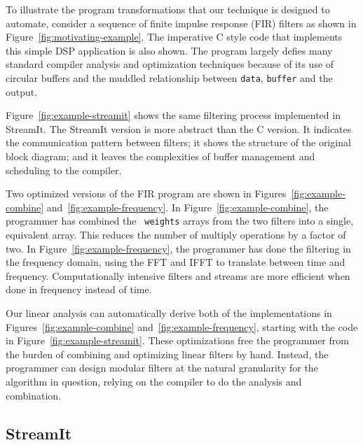 To illustrate the program transformations that our technique is
designed to automate, consider a sequence of finite impulse response
(FIR) filters as shown in Figure~\ref{fig:motivating-example}. The
imperative C style code that implements this simple DSP application is
also shown. The program largely defies many standard compiler analysis
and optimization techniques because of its use of circular buffers and
the muddled relationship between {\tt data}, {\tt buffer} and the
output.

Figure~\ref{fig:example-streamit} shows the same filtering process
implemented in StreamIt. The StreamIt version is more abstract than
the C version.  It indicates the communication pattern between filters;
it shows the structure of the original block diagram; and it leaves
the complexities of buffer management and scheduling to the compiler.

Two optimized versions of the FIR program are shown in
Figures~\ref{fig:example-combine} and~\ref{fig:example-frequency}.  In
Figure~\ref{fig:example-combine}, the programmer has combined the {\tt
weights} arrays from the two filters into a single, equivalent array.
This reduces the number of multiply operations by a factor of two.  In
Figure~\ref{fig:example-frequency}, the programmer has done the
filtering in the frequency domain, using the FFT and IFFT to translate
between time and frequency.  Computationally intensive filters and
streams are more efficient when done in frequency instead of time.

Our linear analysis can automatically derive both of the
implementations in Figures~\ref{fig:example-combine}
and~\ref{fig:example-frequency}, starting with the code in
Figure~\ref{fig:example-streamit}.  These optimizations free the
programmer from the burden of combining and optimizing linear filters
by hand.  Instead, the programmer can design modular filters at the
natural granularity for the algorithm in question, relying on the
compiler to do the analysis and combination.

\subsection{StreamIt}


